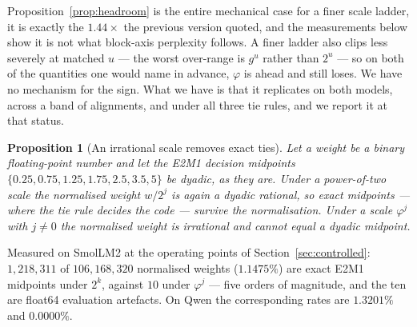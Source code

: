 \documentclass[11pt]{article}
\newtheorem{proposition}[theorem]{Proposition}
\theoremstyle{definition}
\begin{document}
Proposition~\ref{prop:headroom} is the entire mechanical case for a finer scale
ladder, it is exactly the $1.44\times$ the previous version quoted, and the
measurements below show it is not what block-axis perplexity follows. A finer
ladder also clips less severely at matched $u$ --- the worst over-range is
$g^{u}$ rather than $2^{u}$ --- so on both of the quantities one would name in
advance, $\varphi$ is ahead and still loses. We have no mechanism for the sign.
What we have is that it replicates on both models, across a band of alignments,
and under all three tie rules, and we report it at that status.

\begin{proposition}[An irrational scale removes exact ties]
\label{prop:tie}
Let a weight be a binary floating-point number and let the E2M1 decision
midpoints $\{0.25,0.75,1.25,1.75,2.5,3.5,5\}$ be dyadic, as they are. Under a
power-of-two scale the normalised weight $w/2^{j}$ is again a dyadic rational,
so exact midpoints --- where the tie rule decides the code --- survive the
normalisation. Under a scale $\varphi^{j}$ with $j\neq0$ the normalised weight
is irrational and cannot equal a dyadic midpoint.
\end{proposition}

Measured on SmolLM2 at the operating points of Section~\ref{sec:controlled}:
$1{,}218{,}311$ of $106{,}168{,}320$ normalised weights ($1.1475\%$) are exact
E2M1 midpoints under $2^{k}$, against $10$ under $\varphi^{j}$ --- five orders
of magnitude, and the ten are float64 evaluation artefacts. On Qwen the
corresponding rates are $1.3201\%$ and $0.0000\%$.%
\end{document}
